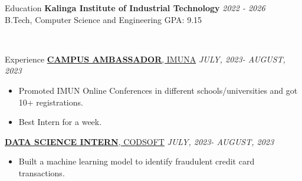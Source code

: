 \documentclass{resume} %
\begin{document}

\begin{rSection}{Education}
{\bf Kalinga Institute of Industrial Technology} \hfill {\em 2022 - 2026} 
\\ B.Tech, Computer Science and Engineering \hfill { GPA: 9.15 }

\\

\end{rSection}
\begin{rSection}{Experience}
\href{https://1drv.ms/i/s!AqmF3ryI8xyngdlvi5puoHlWRF5NTQ?e=hyfCRH}{{\bf CAMPUS AMBASSADOR}{, IMUNA}} \hfill {\em JULY, 2023- AUGUST, 2023}
\begin{itemize}
    \item Promoted IMUN Online Conferences in different schools/universities and got 10+ registrations.
    \item Best Intern for a week.
\end{itemize}
\href{https://1drv.ms/i/s!AqmF3ryI8xyngdlGXj5IJlWhZwavZg?e=YFaQiy}{{\bf  DATA SCIENCE INTERN}{, CODSOFT}} \hfill {\em JULY, 2023- AUGUST, 2023}
\begin{itemize}
    \item Built a machine learning model to identify fraudulent credit card transactions.
\end{itemize}

\end{rSection}
\end{document}
